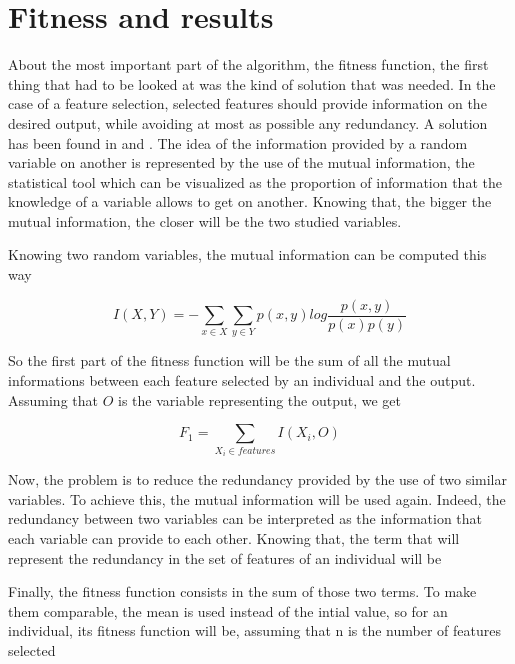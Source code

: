 \documentclass{report}
\begin{document}
		\section{Fitness and results}
		
			About the most important part of the algorithm, the fitness function, the first thing that had to be looked at was the kind of solution that was needed. In the case of a feature selection, selected features should provide information on the desired output, while avoiding at most as possible any redundancy. A solution has been found in \cite{huang2007hybrid} and \cite{chahkandifeature}. The idea of the information provided by a random variable on another is represented by the use of the mutual information, the statistical tool which can be visualized as the proportion of information that the knowledge of a variable allows to get on another. Knowing that, the bigger the mutual information, the closer will be the two studied variables.
			
			Knowing two random variables, the mutual information can be computed this way
			
			\vspace{0.3cm}
			\begin{equation}
				I(X,Y) =- \sum_{x\in X}^{}\sum_{y\in Y}^{} p(x,y)log\frac{p(x,y)}{p(x)p(y)}
			\end{equation}
			\vspace{0.3cm}
			
			So the first part of the fitness function will be the sum of all the mutual informations between each feature selected by an individual and the output. Assuming that $O$ is the variable representing the output, we get 
			
			\vspace{0.3cm}
			\begin{equation}
				F_1 = \sum_{X_i \in features} I(X_i,O)
			\end{equation}
			\vspace{0.3cm}
			
			Now, the problem is to reduce the redundancy provided by the use of two similar variables. To achieve this, the mutual information will be used again. Indeed, the redundancy between two variables can be interpreted as the information that each variable can provide to each other. Knowing that, the term that will represent the redundancy in the set of features of an individual will be
			
			
			Finally, the fitness function consists in the sum of those two terms. To make them comparable, the mean is used instead of the intial value, so for an individual, its fitness function will be, assuming that n is the number of features selected
			
\end{document}
